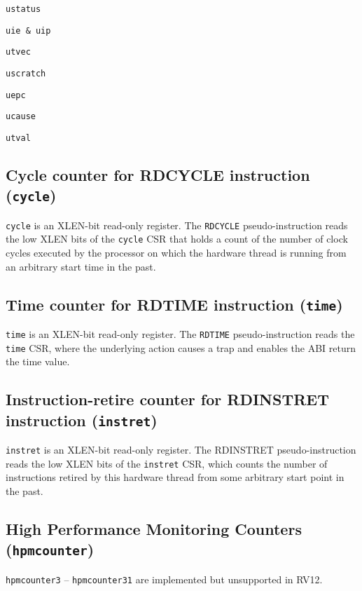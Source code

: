 	\texttt{ustatus}

	\texttt{uie \& uip}

	\texttt{utvec}

	\texttt{uscratch}

	\texttt{uepc}

	\texttt{ucause}

	\texttt{utval}


\subsection{Cycle counter for RDCYCLE instruction (\texttt{cycle})} \label{cycle-counter-for-rdcycle-instruction-cycle}

\texttt{cycle} is an XLEN-bit read-only register. The \texttt{RDCYCLE} pseudo-instruction
reads the low XLEN bits of the \texttt{cycle} CSR that holds a count of the
number of clock cycles executed by the processor on which the hardware
thread is running from an arbitrary start time in the past.

\subsection{Time counter for RDTIME instruction (\texttt{time})} \label{time-counter-for-rdtime-instruction}

\texttt{time} is an XLEN-bit read-only register. The \texttt{RDTIME} pseudo-instruction
reads the \texttt{time} CSR, where the underlying action causes a trap and enables the ABI return the time value.

\subsection{Instruction-retire counter for RDINSTRET instruction
(\texttt{instret})}\label{instruction-retire-counter-for-rdinstret-instruction-instret}

\texttt{instret} is an XLEN-bit read-only register. The RDINSTRET
pseudo-instruction reads the low XLEN bits of the \texttt{instret} CSR, which
counts the number of instructions retired by this hardware thread from
some arbitrary start point in the past.

\subsection{High Performance Monitoring Counters (\texttt{hpmcounter})} \label{high-performance-monitoring-counters}

\texttt{hpmcounter3} -- \texttt{hpmcounter31} are implemented but unsupported in RV12.

